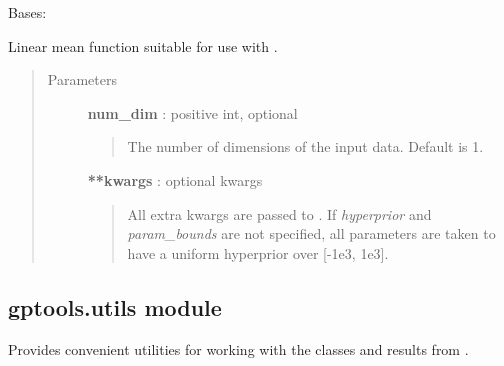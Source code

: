 \documentclass[letterpaper,10pt,english]{sphinxmanual}
\begin{document}
\begin{fulllineitems}
\label{gptools:gptools.mean.LinearMeanFunction}
Bases: {\hyperref[gptools:gptools.mean.MeanFunction]{}}

Linear mean function suitable for use with .
\begin{quote}\begin{description}
\item[{Parameters}] \leavevmode
\textbf{num\_dim} : positive int, optional
\begin{quote}

The number of dimensions of the input data. Default is 1.
\end{quote}

\textbf{**kwargs} : optional kwargs
\begin{quote}

All extra kwargs are passed to {\hyperref[gptools:gptools.mean.MeanFunction]{}}. If \emph{hyperprior}
and \emph{param\_bounds} are not specified, all parameters are taken to have
a uniform hyperprior over {[}-1e3, 1e3{]}.
\end{quote}

\end{description}\end{quote}

\end{fulllineitems}



\subsection{gptools.utils module}
\label{gptools:gptools-utils-module}\label{gptools:module-gptools.utils}
Provides convenient utilities for working with the classes and results from {\hyperref[gptools:module-gptools]{}}.
\end{document}
